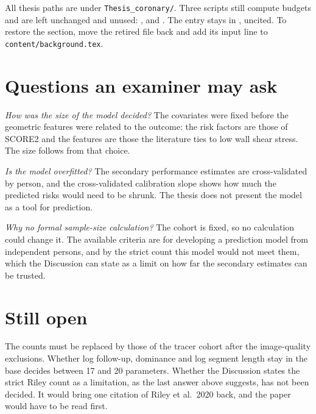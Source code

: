 \documentclass[11pt]{article}
\begin{document}
All thesis paths are under \texttt{Thesis\_coronary/}.
Three scripts still compute budgets and are left unchanged and unused:
,  and .
The entry  stays in , uncited.
To restore the section, move the retired file back and add its input line to
\texttt{content/background.tex}.

\section{Questions an examiner may ask}

\emph{How was the size of the model decided?}
The covariates were fixed before the geometric features were related to the outcome: the risk
factors are those of SCORE2 and the features are those the literature ties to low wall shear stress.
The size follows from that choice.

\emph{Is the model overfitted?}
The secondary performance estimates are cross-validated by person, and the cross-validated
calibration slope shows how much the predicted risks would need to be shrunk.
The thesis does not present the model as a tool for prediction.

\emph{Why no formal sample-size calculation?}
The cohort is fixed, so no calculation could change it.
The available criteria are for developing a prediction model from independent persons, and by the
strict count this model would not meet them, which the Discussion can state as a limit on how far
the secondary estimates can be trusted.

\section{Still open}

The counts must be replaced by those of the tracer cohort after the image-quality exclusions.
Whether log follow-up, dominance and log segment length stay in the base decides between 17 and 20
parameters.
Whether the Discussion states the strict Riley count as a limitation, as the last answer above
suggests, has not been decided.
It would bring one citation of Riley et al.\ 2020 back, and the paper would have to be read first.
\end{document}
